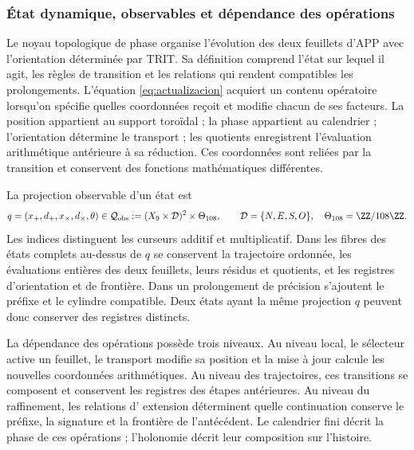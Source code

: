 
\subsubsection{État dynamique, observables et dépendance des opérations}
\label{tpk-int:estado}

Le noyau topologique de phase organise l'évolution des deux feuillets d'APP avec l'orientation déterminée par TRIT. Sa définition comprend l'état sur lequel il agit, les règles de transition et les relations qui rendent compatibles les prolongements. L'équation \eqref{eq:actualizacion} acquiert un contenu opératoire lorsqu'on spécifie quelles coordonnées reçoit et modifie chacun de ses facteurs. La position appartient au support toroïdal ; la phase appartient au calendrier ; l'orientation détermine le transport ; les quotients enregistrent l'évaluation arithmétique antérieure à sa réduction. Ces coordonnées sont reliées par la transition et conservent des fonctions mathématiques différentes.

La projection observable d'un état est
\begin{equation}
 q=(x_+,d_+,x_\times,d_\times,\theta)
 \in\mathcal Q_{\rm obs}
 :=(X_9\times\mathcal D)^2\times\Theta_{108},
 \qquad \mathcal D=\{N,E,S,O\},\quad
 \Theta_{108}=\ZZ/108\ZZ.
 \label{tpk-int:qobs}
\end{equation}
Les indices distinguent les curseurs additif et multiplicatif. Dans les
fibres des états complets au-dessus de \(q\) se conservent la trajectoire ordonnée, les évaluations
entières des deux feuillets, leurs résidus et quotients, et les registres
d'orientation et de frontière. Dans un prolongement de précision s'ajoutent le
préfixe et le cylindre compatible. Deux états ayant la même
projection \(q\) peuvent donc conserver des registres distincts.

La dépendance des opérations possède trois niveaux. Au niveau local,
le sélecteur active un feuillet, le transport modifie sa position et la
mise à jour calcule les nouvelles coordonnées arithmétiques. Au niveau des
trajectoires, ces transitions se composent et conservent les registres des
étapes antérieures. Au niveau du raffinement, les relations d'
extension déterminent quelle continuation conserve le préfixe, la signature et la
frontière de l'antécédent. Le calendrier fini décrit la phase de ces
opérations ; l'holonomie décrit leur composition sur l'histoire.

